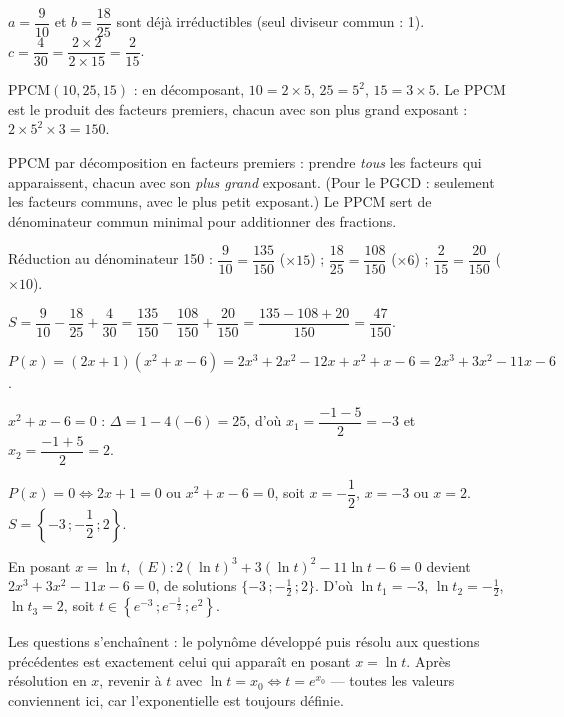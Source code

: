 \documentclass[11pt]{article}
\begin{document}

\begin{questions}
  \item $a = \dfrac{9}{10}$ et $b = \dfrac{18}{25}$ sont déjà irréductibles (seul diviseur commun : 1). $c = \dfrac{4}{30} = \dfrac{2\times 2}{2\times 15} = \dfrac{2}{15}$.
  \item $\mathrm{PPCM}(10, 25, 15)$ : en décomposant, $10 = 2\times 5$, $25 = 5^2$, $15 = 3\times 5$. Le PPCM est le produit des facteurs premiers, chacun avec son plus grand exposant : $2\times 5^2\times 3 = 150$.

\begin{rappel}
PPCM par décomposition en facteurs premiers : prendre \emph{tous} les
facteurs qui apparaissent, chacun avec son \emph{plus grand} exposant.
(Pour le PGCD : seulement les facteurs communs, avec le plus petit
exposant.) Le PPCM sert de dénominateur commun minimal pour additionner
des fractions.
\end{rappel}
  \item \begin{sousq}
    \item Réduction au dénominateur 150 : $\dfrac{9}{10} = \dfrac{135}{150}$ ($\times 15$) ; $\dfrac{18}{25} = \dfrac{108}{150}$ ($\times 6$) ; $\dfrac{2}{15} = \dfrac{20}{150}$ ($\times 10$).
    \item $S = \dfrac{9}{10} - \dfrac{18}{25} + \dfrac{4}{30} = \dfrac{135}{150} - \dfrac{108}{150} + \dfrac{20}{150} = \dfrac{135 - 108 + 20}{150} = \dfrac{47}{150}$.
  \end{sousq}
\end{questions}

\begin{questions}
  \item \begin{sousq}
    \item $P(x) = (2x+1)(x^2 + x - 6) = 2x^3 + 2x^2 - 12x + x^2 + x - 6 = 2x^3 + 3x^2 - 11x - 6$.
    \item $x^2 + x - 6 = 0$ : $\Delta = 1 - 4(-6) = 25$, d'où $x_1 = \dfrac{-1 - 5}{2} = -3$ et $x_2 = \dfrac{-1 + 5}{2} = 2$.
    \item $P(x) = 0 \Leftrightarrow 2x + 1 = 0$ ou $x^2 + x - 6 = 0$, soit $x = -\dfrac{1}{2}$, $x = -3$ ou $x = 2$. $S = \left\{-3\,;-\dfrac{1}{2}\,;2\right\}$.
  \end{sousq}
  \item En posant $x = \ln t$, $(E) : 2(\ln t)^3 + 3(\ln t)^2 - 11\ln t - 6 = 0$ devient $2x^3 + 3x^2 - 11x - 6 = 0$, de solutions $\{-3\,;-\tfrac{1}{2}\,;2\}$. D'où $\ln t_1 = -3$, $\ln t_2 = -\tfrac{1}{2}$, $\ln t_3 = 2$, soit $t \in \left\{e^{-3}\,;e^{-\frac{1}{2}}\,;e^{2}\right\}$.

\begin{methode}
Les questions s'enchaînent : le polynôme développé puis résolu aux
questions précédentes est exactement celui qui apparaît en posant
$x = \ln t$. Après résolution en $x$, revenir à $t$ avec
$\ln t = x_0 \Leftrightarrow t = e^{x_0}$ — toutes les valeurs
conviennent ici, car l'exponentielle est toujours définie.
\end{methode}
\end{questions}
\end{document}
